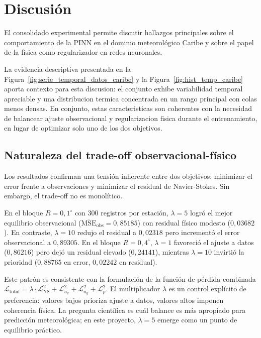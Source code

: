 \chapter{Discusión}

El consolidado experimental permite discutir hallazgos principales sobre el comportamiento de la PINN en el dominio meteorológico Caribe y sobre el papel de la física como regularizador en redes neuronales.

La evidencia descriptiva presentada en la Figura~\ref{fig:serie_temporal_datos_caribe} y la Figura~\ref{fig:hist_temp_caribe} aporta contexto para esta discusion: el conjunto exhibe variabilidad temporal apreciable y una distribucion termica concentrada en un rango principal con colas menos densas. En conjunto, estas caracteristicas son coherentes con la necesidad de balancear ajuste observacional y regularizacion fisica durante el entrenamiento, en lugar de optimizar solo uno de los dos objetivos.

\section{Naturaleza del trade-off observacional-físico}

Los resultados confirman una tensión inherente entre dos objetivos: minimizar el error frente a observaciones y minimizar el residual de Navier-Stokes. Sin embargo, el trade-off no es monolítico.

En el bloque $R=0{,}1^{\circ}$ con 300 registros por estación, $\lambda=5$ logró el mejor equilibrio observacional ($\overline{\text{MSE}}_{\text{obs}}=0{,}85185$) con residual físico modesto ($0{,}03682$). En contraste, $\lambda=10$ redujo el residual a $0{,}02318$ pero incrementó el error observacional a $0{,}89305$. En el bloque $R=0{,}4^{\circ}$, $\lambda=1$ favoreció el ajuste a datos ($0{,}86216$) pero dejó un residual elevado ($0{,}24141$), mientras $\lambda=10$ invirtió la prioridad ($0{,}88765$ en error, $0{,}02242$ en residual).

Este patrón es consistente con la formulación de la función de pérdida combinada $\mathcal{L}_{\text{total}} = \lambda \cdot \mathcal{L}_{\text{NS}}^2 + \mathcal{L}_{u_x}^2 + \mathcal{L}_{u_y}^2 + \mathcal{L}_p^2$. El multiplicador $\lambda$ es un control explícito de preferencia: valores bajos prioriza ajuste a datos, valores altos imponen coherencia física. La pregunta científica es cuál balance es más apropiado para predicción meteorológica; en este proyecto, $\lambda=5$ emerge como un punto de equilibrio práctico.

